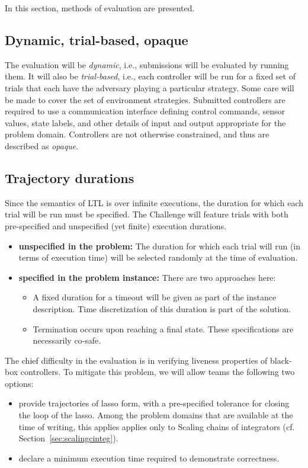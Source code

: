 \documentclass{amsart}
\theoremstyle{definition}
\begin{document}
In this section, methods of evaluation are presented.

\subsection{Dynamic, trial-based, opaque}

The evaluation will be \emph{dynamic}, i.e., submissions will be evaluated by
running them. It will also be \emph{trial-based}, i.e., each controller will be
run for a fixed set of trials that each have the adversary playing a particular
strategy. Some care will be made to cover the set of environment
strategies. Submitted controllers are required to use a communication interface
defining control commands, sensor values, state labels, and other details of
input and output appropriate for the problem domain. Controllers are not
otherwise constrained, and thus are described as \emph{opaque}.

\subsection{Trajectory durations}
Since the semantics of LTL is over infinite executions, the duration for which each trial will be run must be specified. 
The Challenge will feature trials with both pre-specified and unspecified (yet finite) execution durations. 

\begin{itemize}
\item \textbf{unspecified in the problem:}
The duration for which each trial will run (in terms of execution time) will be selected randomly at the time of evaluation.

\item \textbf{specified in the problem instance:}
There are two approaches here:
\begin{itemize}
\item A fixed duration for a timeout will be given as part of the instance description. Time discretization of this duration is part of the solution.
\item Termination occurs upon reaching a final state. These specifications are necessarily co-safe.
\end{itemize}

\end{itemize}

The chief difficulty in the evaluation is in verifying liveness properties of black-box controllers. To mitigate this problem,
we will allow teams the following two options:
\begin{itemize}
\item provide trajectories of lasso form, with a pre-specified tolerance for closing the loop of the lasso. Among the problem domains that are available at the time of writing, this applies applies only to Scaling chains of integrators (cf. Section~\ref{sec:scalingcinteg}).
\item declare a minimum execution time required to demonstrate correctness.
\end{itemize}
\end{document}
